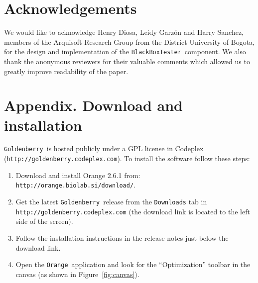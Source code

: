 \documentclass{sig-alternate}
\newcommand{\Orange}{\texttt{Orange}}
\newcommand{\GB}{\texttt{Goldenberry}}
\newcommand{\BBTester}{\texttt{BlackBoxTester}}
\newcommand{\figref}[1]{\mbox{Figure \ref{#1}}}
\begin{document}
\section{Acknowledgements}
We would like to acknowledge Henry Diosa, Leidy Garz\'on and Harry Sanchez, members of the Arquisoft Research Gro\-up from the District University of Bogota, for the design and implementation of the \BBTester~component. We also thank the anonymous reviewers for their valuable comments which allowed us to greatly improve readability of the paper.


{\scriptsize
  
}

\section*{Appendix. Download and installation}
\GB~is hosted publicly under a GPL license in Codeplex (\texttt{http://goldenberry.codeplex.com}). To install the software follow these steps:
\begin{enumerate}
\item Download and install Orange 2.6.1 from:\\ \texttt{http://orange.biolab.si/download/}.
\item  Get the latest \GB~release from the \texttt{Downloads} tab in \texttt{http://goldenberry.codeplex.com} (the download link is located to the left side of the screen).
\item  Follow the installation instructions in the release notes just below the download link.
\item  Open the \Orange~application and look for the ``Optimization'' toolbar in the canvas (as shown in \figref{fig:canvas}).
\end{enumerate}



\vfill
\end{document}
